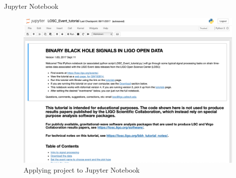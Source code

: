 \begin{frame}{Jupyter Notebook}
    
\begin{figure}
    \centering
    \includegraphics[width=.7\textwidth]{img/jupyter_losc_intro.png}
    \caption{Applying project to Jupyter Notebook}
\end{figure}

\end{frame}